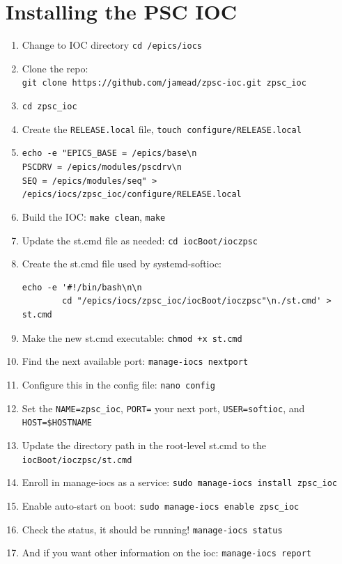 \section{Installing the PSC IOC}
\begin{enumerate}
	\item Change to IOC directory \texttt{cd /epics/iocs}
	\item Clone the repo:\\
	\hspace*{1em} \texttt{git clone https://github.com/jamead/zpsc-ioc.git zpsc\_ioc}
	\item \texttt{cd zpsc\_ioc}
	\item Create the \texttt{RELEASE.local} file, \texttt{touch configure/RELEASE.local}
	\item \texttt{echo -e "EPICS\_BASE = /epics/base\textbackslash n}\\
		\hspace*{2em}\texttt{PSCDRV = /epics/modules/pscdrv\textbackslash n}\\
		\hspace*{2em}\texttt{SEQ = /epics/modules/seq" >}\\
		\hspace*{2em} \texttt{/epics/iocs/zpsc\_ioc/configure/RELEASE.local}
	\item Build the IOC: \texttt{make clean}, \texttt{make}
	\item Update the st.cmd file as needed: \texttt{cd iocBoot/ioczpsc}
	\item Create the st.cmd file used by systemd-softioc: \begin{verbatim}echo -e '#!/bin/bash\n\n
		cd "/epics/iocs/zpsc_ioc/iocBoot/ioczpsc"\n./st.cmd' > st.cmd\end{verbatim}
	\item Make the new st.cmd executable: \texttt{chmod +x st.cmd}
	\item Find the next available port: \texttt{manage-iocs nextport}
	\item Configure this in the config file: \texttt{nano config}
	\item Set the \texttt{NAME=zpsc\_ioc}, \texttt{PORT=} your next port, \texttt{USER=softioc}, and \texttt{HOST=\$HOSTNAME}
	\item Update the directory path in the root-level st.cmd to the \texttt{iocBoot/ioczpsc/st.cmd}
	\item Enroll in manage-iocs as a service: \texttt{sudo manage-iocs install zpsc\_ioc}
	\item Enable auto-start on boot: \texttt{sudo manage-iocs enable zpsc\_ioc}
	\item Check the status, it should be running! \texttt{manage-iocs status}
	\item And if you want other information on the ioc: \texttt{manage-iocs report}
\end{enumerate}




















